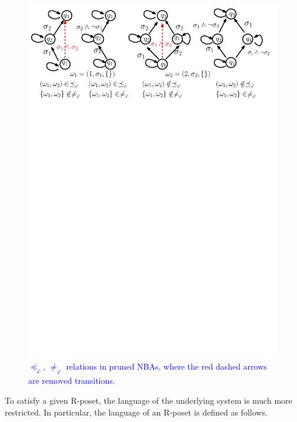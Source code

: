 \begin{figure}
	\centering
	\includegraphics[scale=0.4]{figures/explain_about_remark4.pdf}
	\caption{\textcolor{blue}{$\preceq_\varphi$, $\neq_\varphi$ relations in pruned NBAs,
			where the red dashed arrows are removed transitions.}}
	\label{fig:example_remark_4}
\end{figure}

To satisfy a given R-poset, the language of the underlying system is
much more restricted.
In particular, the language of an R-poset is defined as follows.

